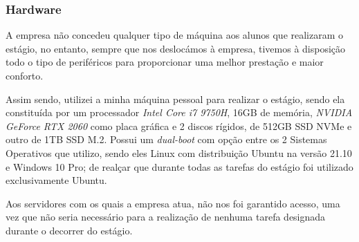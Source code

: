 \documentclass{article}
\begin{document}
\subsubsection{Hardware}
\hspace*{0.5cm} A empresa não concedeu qualquer tipo de máquina aos alunos que realizaram o estágio, no entanto, sempre que nos deslocámos à empresa, tivemos à disposição todo o tipo de periféricos para proporcionar uma melhor prestação e maior conforto. \newline

\hspace*{0.5cm} Assim sendo, utilizei a minha máquina pessoal para realizar o estágio, sendo ela constituída por um processador \emph{Intel Core i7 9750H}, 16GB de memória, \emph{NVIDIA GeForce RTX 2060} como placa gráfica e 2 discos rígidos, de 512GB SSD NVMe e outro de 1TB SSD M.2. Possui um \emph{dual-boot} com opção entre os 2 Sistemas Operativos que utilizo, sendo eles Linux com distribuição Ubuntu na versão 21.10 e Windows 10 Pro; de realçar que durante todas as tarefas do estágio foi utilizado exclusivamente Ubuntu. \newline

\hspace*{0.5cm} Aos servidores com os quais a empresa atua, não nos foi garantido acesso, uma vez que não seria necessário para a realização de nenhuma tarefa designada durante o decorrer do estágio. \newline
\end{document}
